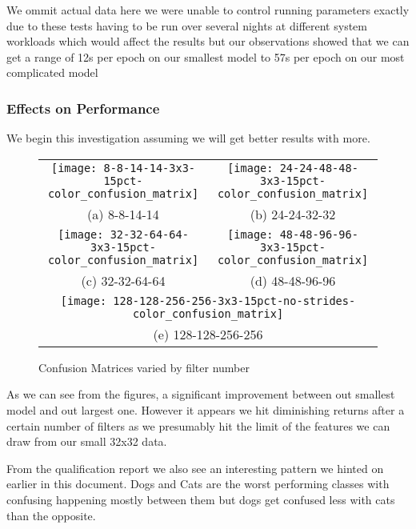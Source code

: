 We ommit actual data here we were unable to control running parameters exactly due to these tests having to be run over several nights at different system workloads which would affect the results but our observations showed that we can get a range of 12s per epoch on our smallest model to 57s per epoch on our most complicated model
\subsubsection{Effects on Performance}
We begin this investigation assuming we will get better results with more. 
\begin{figure}
	\begin{tabular}{cc}
		\texttt{[image: 8-8-14-14-3x3-15pct-color\_confusion\_matrix]} &   \texttt{[image: 24-24-48-48-3x3-15pct-color\_confusion\_matrix]} \\
		(a) 8-8-14-14 & (b) 24-24-32-32 \\[6pt]
		\texttt{[image: 32-32-64-64-3x3-15pct-color\_confusion\_matrix]} &   \texttt{[image: 48-48-96-96-3x3-15pct-color\_confusion\_matrix]} \\
		(c) 32-32-64-64 & (d) 48-48-96-96 \\[6pt]
		\multicolumn{2}{c}{\texttt{[image: 128-128-256-256-3x3-15pct-no-strides-color\_confusion\_matrix]} }\\
		\multicolumn{2}{c}{(e) 128-128-256-256}
	\end{tabular}
	\caption{Confusion Matrices varied by filter number}
\end{figure}

As we can see from the figures, a significant improvement between out smallest model and out largest one. However it appears we hit diminishing returns after a certain number of filters as we presumably hit the limit of the features we can draw from our small 32x32 data.

From the qualification report we also see an interesting pattern we hinted on earlier in this document. Dogs and Cats are the worst performing classes with confusing happening mostly between them but dogs get confused less with cats than the opposite.

